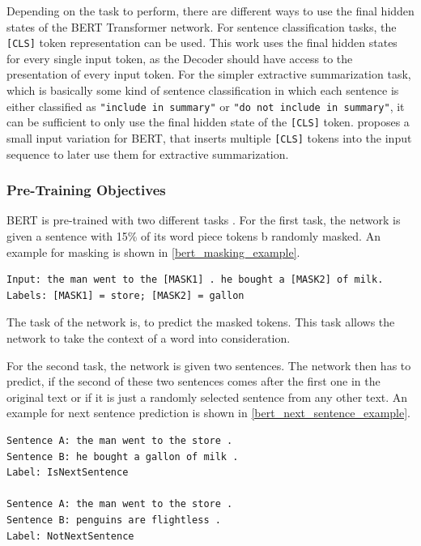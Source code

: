 Depending on the task to perform, there are different ways to use the final hidden states of the BERT Transformer network.
For sentence classification tasks, the \texttt{[CLS]} token representation can be used.
This work uses the final hidden states for every single input token, as the Decoder should have access to the presentation of every input token.
For the simpler extractive summarization task, which is basically some kind of sentence classification in which each sentence is either classified as \texttt{"include in summary"} or \texttt{"do not include in summary"}, it can be sufficient to only use the final hidden state of the \texttt{[CLS]} token. 
\cite{1903.10318} proposes a small input variation for BERT, that inserts multiple \texttt{[CLS]} tokens into the input sequence to later use them for extractive summarization.

\subsubsection{Pre-Training Objectives}

BERT is pre-trained with two different tasks \cite[p.~4--5]{devlin2018bert}.
For the first task, the network is given a sentence with 15\% of its word piece tokens b randomly masked.
An example for masking is shown in \autoref{bert_masking_example}.

\begin{lstlisting}[caption={Masked input example. Taken from the BERT GitHub page.},captionpos=b,numbers=none,label=bert_masking_example]
Input: the man went to the [MASK1] . he bought a [MASK2] of milk.
Labels: [MASK1] = store; [MASK2] = gallon
\end{lstlisting}

The task of the network is, to predict the masked tokens.
This task allows the network to take the context of a word into consideration.

For the second task, the network is given two sentences.
The network then has to predict, if the second of these two sentences comes after the first one in the original text or if it is just a randomly selected sentence from any other text.
An example for next sentence prediction is shown in \autoref{bert_next_sentence_example}.

\begin{lstlisting}[caption={Next sentence prediction example. Taken from the BERT GitHub page.},captionpos=b,numbers=none,label=bert_next_sentence_example]
Sentence A: the man went to the store .
Sentence B: he bought a gallon of milk .
Label: IsNextSentence

Sentence A: the man went to the store .
Sentence B: penguins are flightless .
Label: NotNextSentence
\end{lstlisting}

